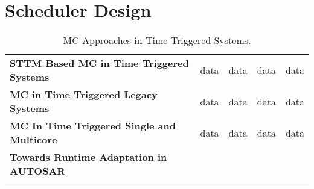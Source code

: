 \section{Scheduler Design}
\begin{table}[]
	\centering
	\caption{MC Approaches in Time Triggered Systems.}
	\label{my-label}
	\begin{tabular}{lllll}
		
		\textbf{STTM Based MC in Time Triggered Systems} & data & data & data & data \\
		\textbf{MC in Time Triggered Legacy Systems} & data & data & data & data \\
		\textbf{MC In Time Triggered Single and Multicore} & data & data & data & data \\
\textbf{Towards Runtime Adaptation in AUTOSAR} & & & & \\
		&      &      &      &     
	\end{tabular}
\end{table}